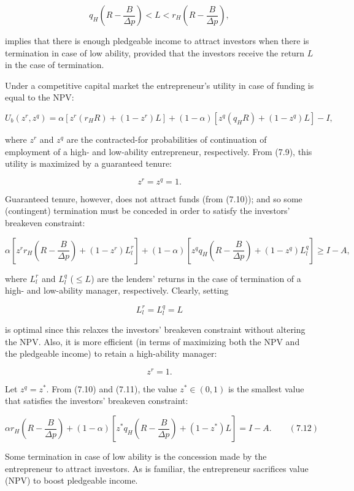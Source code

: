 \documentclass[11pt,a4paper]{article}
\begin{document}
\[q_H\left(R - \frac{B}{\Delta p}\right) < L < r_H\left(R - \frac{B}{\Delta p}\right),\]

implies that there is enough pledgeable income to attract investors when there is termination in
case of low ability, provided that the investors receive the return \(L\) in the case of
termination.

Under a competitive capital market the entrepreneur's utility in case of funding is equal to the
NPV:

\[U_b(z^r, z^q) = \alpha[z^r(r_H R) + (1 - z^r)L] + (1 - \alpha)[z^q(q_H R) + (1 - z^q)L] - I,\]

where \(z^r\) and \(z^q\) are the contracted-for probabilities of continuation of employment of a
high- and low-ability entrepreneur, respectively. From (7.9), this utility is maximized by a
guaranteed tenure:

\[z^r = z^q = 1.\]

Guaranteed tenure, however, does not attract funds (from (7.10)); and so some (contingent)
termination must be conceded in order to satisfy the investors' breakeven constraint:

\[\alpha\left[z^r r_H\left(R - \frac{B}{\Delta p}\right) + (1 - z^r)L_l^r\right] + (1 - \alpha)\left[z^q q_H\left(R - \frac{B}{\Delta p}\right) + (1 - z^q)L_l^q\right] \geqslant I - A,\]

where \(L_l^r\) and \(L_l^q\) (\(\leqslant L\)) are the lenders' returns in the case of termination
of a high- and low-ability manager, respectively. Clearly, setting

\[L_l^r = L_l^q = L\]

is optimal since this relaxes the investors' breakeven constraint without altering the NPV. Also, it
is more efficient (in terms of maximizing both the NPV and the pledgeable income) to retain a
high-ability manager:

\[z^r = 1.\]

Let \(z^q = z^*\). From (7.10) and (7.11), the value \(z^* \in (0, 1)\) is the smallest value that
satisfies the investors' breakeven constraint:

\[\alpha r_H\left(R - \frac{B}{\Delta p}\right) + (1 - \alpha)\left[z^* q_H\left(R - \frac{B}{\Delta p}\right) + (1 - z^*)L\right] = I - A. \qquad (7.12)\]

Some termination in case of low ability is the concession made by the entrepreneur to attract
investors. As is familiar, the entrepreneur sacrifices value (NPV) to boost pledgeable income.
\end{document}

